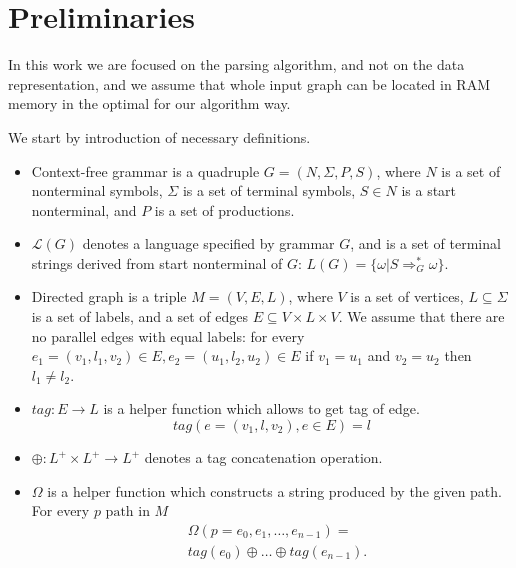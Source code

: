 \section{Preliminaries}

In this work we are focused on the parsing algorithm, and not on the data representation, and we assume that whole input graph can be located in RAM memory in the optimal for our algorithm way.

We start by introduction of necessary definitions.
\begin{itemize}
  \item Context-free grammar is a quadruple $G=(N, \Sigma, P, S)$, where $N$ is a set of nonterminal symbols, $\Sigma$ is a set of terminal symbols, $S \in N$ is a start nonterminal, and $P$ is a set of productions. 
  \item $\mathcal{L}(G)$ denotes a language specified by grammar $G$, and is a set of terminal strings derived from start nonterminal of $G$: $L(G) = \{\omega | S \Rightarrow_{G}^{*} \omega\}$.
  \item Directed graph is a triple $M = (V,E,L)$, where $V$ is a set of vertices, $L \subseteq \Sigma$ is a set of labels, and a set of edges $E\subseteq V\times L\times V$. 
  We assume that there are no parallel edges with equal labels: for every $e_1=(v_1,l_1,v_2) \in E, e_2=(u_1,l_2,u_2) \in E$ if $v_1 = u_1$ and $v_2 = u_2$ then $l_1 \neq l_2$.
  \item $tag: E \rightarrow L$ is a helper function which allows to get tag of edge. $$tag(e = (v_1,l,v_2), e \in E) = l$$
  \item $\oplus: L^+ \times L^+ \rightarrow L^+$ denotes a tag concatenation operation.
  \item $\Omega$ is a helper function which constructs a string produced by the given path. For every $p \text{ path in } M$
  \begin{align*}
  & \Omega(p = e_{0},e_{1},\dots,e_{n-1}) = \\
  & tag (e_{0}) \oplus \dots \oplus tag (e_{n-1}).
  \end{align*}
\end{itemize}

